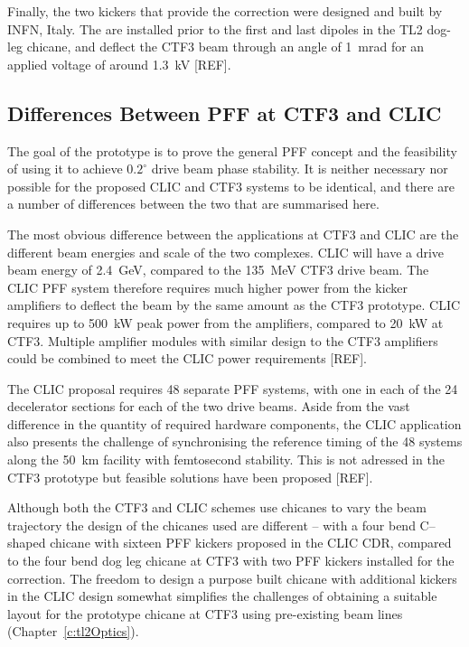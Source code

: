 Finally, the two kickers that provide the correction were designed and built by INFN, Italy. The are installed prior to the first and last dipoles in the TL2 dog-leg chicane, and deflect the CTF3 beam through an angle of 1~mrad for an applied voltage of around 1.3~kV [REF].


\subsection{Differences Between PFF at CTF3 and CLIC}
\label{ss:ctfVsCLIC}

The goal of the prototype is to prove the general PFF concept and the feasibility of using it to achieve \(0.2^\circ\) drive beam phase stability. It is neither necessary nor possible for the proposed CLIC and CTF3 systems to be identical, and there are a number of differences between the two that are summarised here. 

The most obvious difference between the applications at CTF3 and CLIC are the different beam energies and scale of the two complexes. CLIC will have a drive beam energy of 2.4~GeV, compared to the 135~MeV CTF3 drive beam. The CLIC PFF system therefore requires much higher power from the kicker amplifiers to deflect the beam by the same amount as the CTF3 prototype. CLIC requires up to 500~kW peak power from the amplifiers, compared to 20~kW at CTF3. Multiple amplifier modules with similar design to the CTF3 amplifiers could be combined to meet the CLIC power requirements [REF].

The CLIC proposal requires 48 separate PFF systems, with one in each of the 24 decelerator sections for each of the two drive beams. Aside from the vast difference in the quantity of required hardware components, the CLIC application also presents the challenge of synchronising the reference timing of the 48 systems along the 50~km facility with femtosecond stability. This is not adressed in the CTF3 prototype but feasible solutions have been proposed [REF].

Although both the CTF3 and CLIC schemes use chicanes to vary the beam trajectory the design of the chicanes used are different -- with a four bend C--shaped chicane with sixteen PFF kickers proposed in the CLIC CDR, compared to the four bend dog leg chicane at CTF3 with two PFF kickers installed for the correction. The freedom to design a purpose built chicane with additional kickers in the CLIC design somewhat simplifies the challenges of obtaining a suitable layout for the prototype chicane at CTF3 using pre-existing beam lines (Chapter~\ref{c:tl2Optics}).

